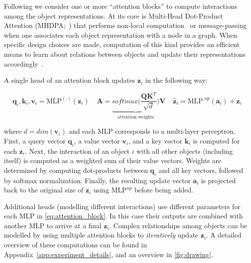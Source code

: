 \documentclass{article}
\begin{document}
Following \cite{zambaldi2018relational} we consider one or more ``attention blocks'' to compute interactions among the object representations.
At its core is Multi-Head Dot-Product Attention (MHDPA;~\cite{vaswani2017attention}) that performs non-local computation~\citep{wang2018non} or message-passing~\citep{gilmer2017neural} when one associates each object representation with a node in a graph.
When specific design choices are made, computation of this kind provides an efficient means to learn about relations between objects and update their representations accordingly~\citep{battaglia2018relational}.

A single head of an attention block updates $\bm{z}_i$ in the following way:

\begin{equation}
    \bm{q}_i, \bm{k}_i, \bm{v}_i = \text{MLP}^{(\cdot)}(\bm{z}_i) \ \ \ \ \ \bm{A} = \underbrace{softmax\big(\frac{\bm{Q}\bm{K}^{T}}{\sqrt{d}}\big)}_{\text{attention weights}}\bm{V} \ \ \ \ \ \bm{\hat{z}}_i = \text{MLP}^{\textit{ up}}(\bm{a}_i) + \bm{z}_i
    \label{eq:attention_block}
\end{equation}

where $d=dim(\bm{v}_i)$ and each $\text{MLP}$ corresponds to a multi-layer perceptron. First, a query vector $\bm{q}_i$, a value vector $\bm{v}_i$, and a key vector $\bm{k}_i$ is computed for each $\bm{z}_i$.
Next, the interaction of an object $i$ with all other objects (including itself) is computed as a weighted sum of their value vectors.
Weights are determined by computing dot-products between $\bm{q}_i$ and all key vectors, followed by softmax normalization.
Finally, the resulting update vector $\bm{a}_i$ is projected back to the original size of $\bm{z}_i$ using $\text{MLP}^{\textit{up}}$ before being added.

Additional heads (modelling different interactions) use different parameters for each MLP in \eqref{eq:attention_block}.
In this case their outputs are combined with another MLP to arrive at a final $\bm{z}_i$.
Complex relationships among objects can be modelled by using multiple attention blocks to \emph{iteratively} update $\bm{z}_i$.
A detailed overview of these computations can be found in Appendix~\ref{app:experiment_details}, and an overview in \autoref{fig:drawing}.
\end{document}
